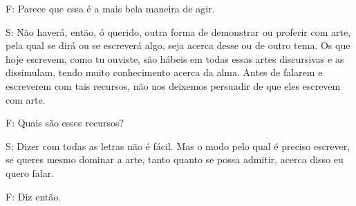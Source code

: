 F: Parece que essa é a mais bela maneira de agir.

 

S: Não haverá, então, ó querido, outra forma de demonstrar ou proferir
com arte, pela qual se dirá ou se escreverá algo, seja acerca desse ou
de outro tema. \bekker{[271c]} Os que hoje escrevem, como tu ouviste, são
hábeis em todas essas artes discursivas e as dissimulam, tendo muito
conhecimento acerca da alma. Antes de falarem e escreverem com tais
recursos, não nos deixemos persuadir de que eles escrevem com arte.

 

F: Quais são esses recursos?

 

S: Dizer com todas as letras não é fácil. Mas o modo pelo qual é preciso
escrever, se queres mesmo dominar a arte, tanto quanto se possa admitir,
acerca disso eu quero falar.

 

F: Diz então.

 

